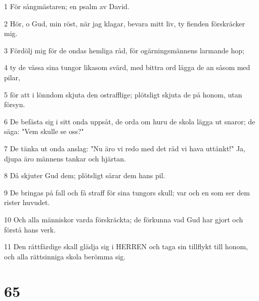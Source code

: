 \par 1 För sångmästaren; en psalm av David.
\par 2 Hör, o Gud, min röst, när jag klagar, bevara mitt liv, ty fienden förskräcker mig.
\par 3 Fördölj mig för de ondas hemliga råd, för ogärningsmännens larmande hop;
\par 4 ty de vässa sina tungor likasom svärd, med bittra ord lägga de an såsom med pilar,
\par 5 för att i lönndom skjuta den ostrafflige; plötsligt skjuta de på honom, utan försyn.
\par 6 De befästa sig i sitt onda uppsåt, de orda om huru de skola lägga ut snaror; de säga: "Vem skulle se oss?"
\par 7 De tänka ut onda anslag: "Nu äro vi redo med det råd vi hava uttänkt!" Ja, djupa äro männens tankar och hjärtan.
\par 8 Då skjuter Gud dem; plötsligt sårar dem hans pil.
\par 9 De bringas på fall och få straff för sina tungors skull; var och en som ser dem rister huvudet.
\par 10 Och alla människor varda förskräckta; de förkunna vad Gud har gjort och förstå hans verk.
\par 11 Den rättfärdige skall glädja sig i HERREN och taga sin tillflykt till honom, och alla rättsinniga skola berömma sig.

\chapter{65}

